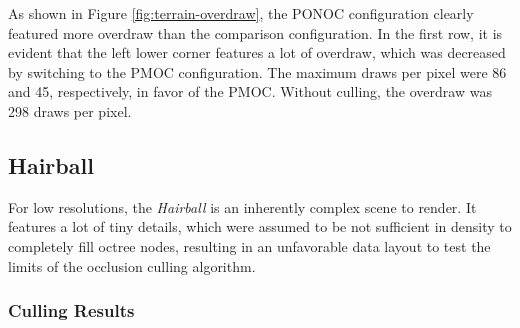 \noindent
As shown in Figure \ref{fig:terrain-overdraw}, the \ac{PONOC} configuration clearly 
featured more overdraw than the comparison configuration. In the first row, it is evident that 
the left lower corner features a lot of overdraw, which was decreased by switching to the 
\ac{PMOC} configuration. The maximum draws per pixel were 86 and 45, respectively, in 
favor of the \ac{PMOC}. Without culling, the overdraw was 298 draws per pixel.

\clearpage



\subsection*{Hairball}

For low resolutions, the \emph{Hairball} is an inherently complex scene to render. It features a lot of 
tiny details, which were assumed to be not sufficient in density to completely fill octree nodes, 
resulting in an unfavorable data layout to test the limits of the occlusion culling algorithm.

\subsubsection*{Culling Results} \label{subsubsec-culling-results-hairball}


